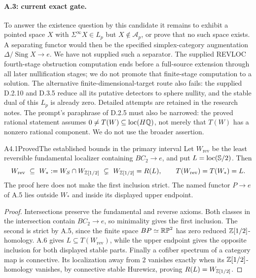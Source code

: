 \paragraph{A.3: current exact gate.}
To answer the existence question by this candidate it remains to exhibit a pointed space $X$ with $\Sigma^\infty X\in L_p$ but $X\notin\mathcal A_p$, or prove that no such space exists. A separating functor would then be the specified simplex-category augmentation $\Delta/\operatorname{Sing}X\to e$. We have not supplied such a separator. The supplied REVLOC fourth-stage obstruction computation ends before a full-source extension through all later nullification stages; we do not promote that finite-stage computation to a solution. The alternative finite-dimensional-target route also fails: the supplied D.2.10 and D.3.5 reduce all its putative detectors to sphere nullity, and the stable dual of this $L_p$ is already zero. Detailed attempts are retained in the research notes. The prompt's paraphrase of D.2.5 must also be narrowed: the proved rational statement assumes $0\ne T(W)\subseteq\operatorname{loc}(H\mathbb Q)$, not merely that $T(W)$ has a nonzero rational component. We do not use the broader assertion.

\begin{claim}{A4.1}{Proved}{The established bounds in the primary interval}\label{A41}
Let $W_{\mathrm{rev}}$ be the least reversible fundamental localizer containing $BC_2\to e$, and put $L=\operatorname{loc}(\mathbb S/2)$. Then
\[
 W_{\mathrm{rev}}\ \subseteq\ W_*:=W_S\cap W_{\mathbb Z[1/2]}
 \ \subsetneq\ W_{\mathbb Z[1/2]}=R(L),
 \qquad T(W_{\mathrm{rev}})=T(W_*)=L.
\]
The proof here does not make the first inclusion strict. The named functor $P\to e$ of A.5 lies outside $W_*$ and inside its displayed upper endpoint.
\end{claim}
\begin{proof}
Intersections preserve the fundamental and reverse axioms. Both classes in the intersection contain $BC_2\to e$, so minimality gives the first inclusion. The second is strict by A.5, since the finite space $BP\simeq\mathbb{RP}^2$ has zero reduced $\mathbb Z[1/2]$-homology. A.6 gives $L\subseteq T(W_{\mathrm{rev}})$, while the upper endpoint gives the opposite inclusion for both displayed stable parts. Finally a cofiber spectrum of a category map is connective. Its localization away from $2$ vanishes exactly when its $\mathbb Z[1/2]$-homology vanishes, by connective stable Hurewicz, proving $R(L)=W_{\mathbb Z[1/2]}$.
\end{proof}

